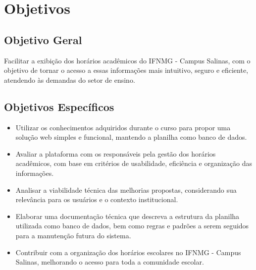 \chapter{Objetivos} 
\label{cap2_objetivos} 

\section{Objetivo Geral}

Facilitar a exibição dos horários acadêmicos do IFNMG - Campus Salinas, com o objetivo de tornar o acesso a essas informações mais intuitivo, seguro e eficiente, atendendo às demandas do setor de ensino.

\section{Objetivos Específicos}

\begin{itemize}
    \item Utilizar os conhecimentos adquiridos durante o curso para propor uma solução web simples e funcional, mantendo a planilha como banco de dados.
    \item Avaliar a plataforma com os responsáveis pela gestão dos horários acadêmicos, com base em critérios de usabilidade, eficiência e organização das informações.
    \item Analisar a viabilidade técnica das melhorias propostas, considerando sua relevância para os usuários e o contexto institucional.
    \item Elaborar uma documentação técnica que descreva a estrutura da planilha utilizada como banco de dados, bem como regras e padrões a serem seguidos para a manutenção futura do sistema.
    \item Contribuir com a organização dos horários escolares no IFNMG - Campus Salinas, melhorando o acesso para toda a comunidade escolar.
\end{itemize}
